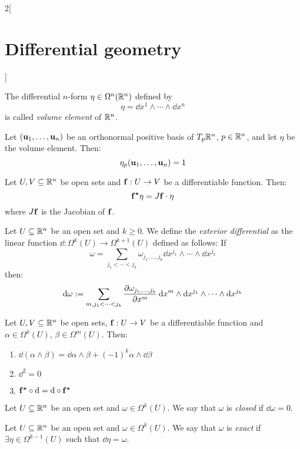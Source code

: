 \documentclass[../../../main.tex]{subfiles}
\begin{document}
\begin{multicols}{2}[\section{Differential geometry}]
\begin{proposition}
  \end{proposition}
  \begin{definition}
    The differential $n$-form $\eta\in\Omega^n(\mathbb{R}^n)$ defined by $$\eta=\dd{x^1}\wedge\cdots\wedge\dd{x^n}$$ is called \emph{volume element} of $\mathbb{R}^n$.
  \end{definition}
  \begin{lemma}
    Let $(\boldsymbol{\mathrm{u}}_1,\ldots,\boldsymbol{\mathrm{u}}_n)$ be an orthonormal positive basis of $T_p\mathbb{R}^n$, $p\in\mathbb{R}^n$, and let $\eta$ be the volume element. Then: $$\eta_p(\boldsymbol{\mathrm{u}}_1,\ldots,\boldsymbol{\mathrm{u}}_n)=1$$
  \end{lemma}
  \begin{proposition}
    Let $U,V\subseteq\mathbb{R}^n$ be open sets and $\boldsymbol{\mathrm{f}}:U\rightarrow V$ be a differentiable function. Then: $$\boldsymbol{\mathrm{f^*}}\eta=J\boldsymbol{\mathrm{f}}\cdot\eta$$ where $J\boldsymbol{\mathrm{f}}$ is the Jacobian of $\boldsymbol{\mathrm{f}}$.
  \end{proposition}
  \begin{definition}
    Let $U\subseteq\mathbb{R}^n$ be an open set and $k\geq 0$. We define the \emph{exterior differential} as the linear function $\dd:\Omega^k(U)\rightarrow\Omega^{k+1}(U)$ defined as follows: If $$\omega=\sum_{j_1<\cdots<j_k}\omega_{j_1,\ldots,j_k}\dd{x^{j_1}}\wedge\cdots\wedge\dd{x^{j_k}}$$
    then: $$\dd{\omega}:=\sum_{m,j_1<\cdots<j_k}\pdv{\omega_{j_1,\ldots,j_k}}{x^m}\dd{x^m}\wedge\dd{x^{j_1}}\wedge\cdots\wedge\dd{x^{j_k}}$$
  \end{definition}
  \begin{proposition}
    Let $U,V\subseteq\mathbb{R}^n$ be open sets, $\boldsymbol{\mathrm{f}}:U\rightarrow V$ be a differentiable function and $\alpha\in\Omega^k(U)$, $\beta\in\Omega^m(U)$. Then:
    \begin{enumerate}
      \item $\dd{(\alpha\wedge\beta)}=\dd{\alpha}\wedge\beta+{(-1)}^k\alpha\wedge\dd{\beta}$
      \item $\dd^2=0$
      \item $\boldsymbol{\mathrm{f^*}}\circ\dd{}=\dd{}\circ\boldsymbol{\mathrm{f^*}}$
    \end{enumerate}
  \end{proposition}
  \begin{definition}
    Let $U\subseteq\mathbb{R}^n$ be an open set and $\omega\in\Omega^k(U)$. We say that $\omega$ is \emph{closed} if $\dd{\omega}=0$.
  \end{definition}
  \begin{definition}
    Let $U\subseteq\mathbb{R}^n$ be an open set and $\omega\in\Omega^k(U)$. We say that $\omega$ is \emph{exact} if $\exists \eta\in\Omega^{k-1}(U)$ such that $\dd{\eta}=\omega$.
  \end{definition}

\end{multicols}
\end{document}
